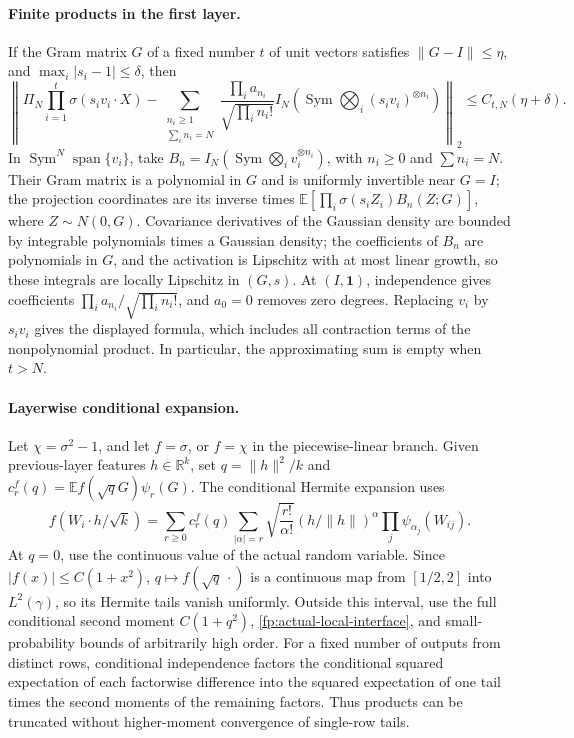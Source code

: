 \documentclass[a4paper]{tufte-handout}
\newcommand{\E}{\mathbb E}
\newcommand{\R}{\mathbb R}
\DeclareMathOperator{\Sym}{Sym}
\begin{document}
\begin{fullwidth}
\paragraph{Finite products in the first layer.}
If the Gram matrix $G$ of a fixed number $t$ of unit vectors satisfies $\|G-I\|\le\eta$,
and $\max_i|s_i-1|\le\delta$, then
\begin{equation}\label{fp:actual-ridge-projection}
 \left\|\Pi_N\prod_{i=1}^t\sigma(s_iv_i\cdot X)
 -\sum_{\substack{n_i\ge1\\\sum_i n_i=N}}
 \frac{\prod_i a_{n_i}}{\sqrt{\prod_i n_i!}}
 I_N\!\left(\Sym\bigotimes_i(s_iv_i)^{\otimes n_i}\right)
 \right\|_2\le C_{t,N}(\eta+\delta).
\end{equation}
In $\Sym^N\operatorname{span}\{v_i\}$, take
$B_n=I_N(\Sym\bigotimes_i v_i^{\otimes n_i})$, with $n_i\ge0$ and $\sum n_i=N$.
Their Gram matrix is a polynomial in $G$ and is uniformly invertible near $G=I$; the projection coordinates are
its inverse times $\E[\prod_i\sigma(s_iZ_i)B_n(Z;G)]$, where $Z\sim N(0,G)$.
Covariance derivatives of the Gaussian density are bounded by integrable polynomials times a Gaussian density;
the coefficients of $B_n$ are polynomials in $G$, and the activation is Lipschitz with at most linear growth,
so these integrals are locally Lipschitz in $(G,s)$. At $(I,\mathbf1)$,
independence gives coefficients $\prod_i a_{n_i}/\sqrt{\prod_i n_i!}$, and $a_0=0$ removes zero degrees.
Replacing $v_i$ by $s_iv_i$ gives the displayed formula, which includes all contraction terms of the nonpolynomial product.
In particular, the approximating sum is empty when $t>N$.

\paragraph{Layerwise conditional expansion.}
Let $\chi=\sigma^2-1$, and let $f=\sigma$, or $f=\chi$ in the piecewise-linear branch.
Given previous-layer features $h\in\R^k$, set $q=\|h\|^2/k$ and
$c_r^f(q)=\E f(\sqrt qG)\psi_r(G)$. The conditional Hermite expansion uses
\begin{equation}\label{fp:actual-multivariate}
 f(W_i\cdot h/\sqrt k)=\sum_{r\ge0}c_r^f(q)
 \sum_{|\alpha|=r}\sqrt{\frac{r!}{\alpha!}}
 (h/\|h\|)^\alpha\prod_j\psi_{\alpha_j}(W_{ij}).
\end{equation}
At $q=0$, use the continuous value of the actual random variable. Since $|f(x)|\le C(1+x^2)$,
$q\mapsto f(\sqrt q\,\cdot)$ is a continuous map from $[1/2,2]$ into $L^2(\gamma)$,
so its Hermite tails vanish uniformly. Outside this interval, use the full conditional second moment $C(1+q^2)$,
\eqref{fp:actual-local-interface}, and small-probability bounds of arbitrarily high order.
For a fixed number of outputs from distinct rows, conditional independence factors the conditional squared expectation of each factorwise difference into
the squared expectation of one tail times the second moments of the remaining factors. Thus products can be truncated without higher-moment convergence of single-row tails.


\end{fullwidth}
\end{document}

